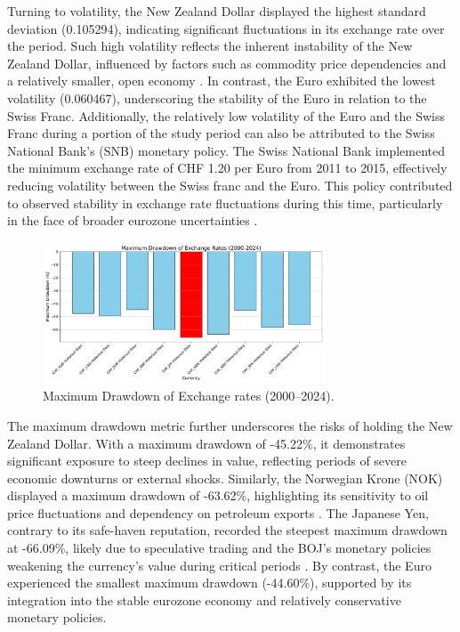\documentclass[11pt,a4paper,english,oneside]{book}
\begin{document}
Turning to volatility, the New Zealand Dollar displayed the highest standard deviation (0.105294), indicating significant fluctuations in its exchange rate over the period. Such high volatility reflects the inherent instability of the New Zealand Dollar, influenced by factors such as commodity price dependencies and a relatively smaller, open economy \parencite{chen2003commodity}. In contrast, the Euro exhibited the lowest volatility (0.060467), underscoring the stability of the Euro in relation to the Swiss Franc. Additionally, the relatively low volatility of the Euro and the Swiss Franc during a portion of the study period can also be attributed to the Swiss National Bank’s (SNB) monetary policy. The Swiss National Bank implemented the minimum exchange rate of CHF 1.20 per Euro from 2011 to 2015, effectively reducing volatility between the Swiss franc and the Euro. This policy contributed to observed stability in exchange rate fluctuations during this time, particularly in the face of broader eurozone uncertainties \parencite{auer2015safe}.

\begin{figure}[h!]
    \centering
    \includegraphics[width=0.75\textwidth]{../../images/maximum_drawdown_2000_2024.pdf}
    \caption{Maximum Drawdown of Exchange rates (2000--2024).}
    \label{fig:maximum_drawdown_2000_2024}
\end{figure}

The maximum drawdown metric further underscores the risks of holding the New Zealand Dollar. With a maximum drawdown of -45.22\%, it demonstrates significant exposure to steep declines in value, reflecting periods of severe economic downturns or external shocks. Similarly, the Norwegian Krone (NOK) displayed a maximum drawdown of -63.62\%, highlighting its sensitivity to oil price fluctuations and dependency on petroleum exports \parencite{bergholt2016business}. The Japanese Yen, contrary to its safe-haven reputation, recorded the steepest maximum drawdown at -66.09\%, likely due to speculative trading and the BOJ's monetary policies weakening the currency's value during critical periods \parencite{shirai2020bank}. By contrast, the Euro experienced the smallest maximum drawdown (-44.60\%), supported by its integration into the stable eurozone economy and relatively conservative monetary policies.
\end{document}
